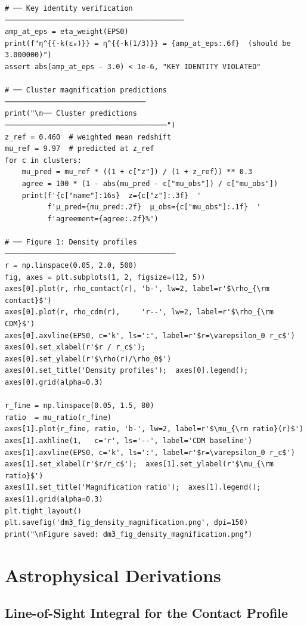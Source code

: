 \documentclass[11pt,a4paper,openright]{book}
\theoremstyle{dm3thm}
\theoremstyle{dm3def}
\begin{document}
\begin{lstlisting}[style=pythonstyle,caption={dark\_matter\_simulation.py ---
  Numerical verification of the dm\textsuperscript{3} predictions.},
  label={lst:python}]
# ── Key identity verification ──────────────────────────────────────────
amp_at_eps = eta_weight(EPS0)
print(f"η^{{-k(ε₀)}} = η^{{-k(1/3)}} = {amp_at_eps:.6f}  (should be 3.000000)")
assert abs(amp_at_eps - 3.0) < 1e-6, "KEY IDENTITY VIOLATED"

# ── Cluster magnification predictions ─────────────────────────────────
print("\n── Cluster predictions ──────────────────────────────────────")
z_ref = 0.460  # weighted mean redshift
mu_ref = 9.97  # predicted at z_ref
for c in clusters:
    mu_pred = mu_ref * ((1 + c["z"]) / (1 + z_ref)) ** 0.3
    agree = 100 * (1 - abs(mu_pred - c["mu_obs"]) / c["mu_obs"])
    print(f'{c["name"]:16s}  z={c["z"]:.3f}  '
          f'μ_pred={mu_pred:.2f}  μ_obs={c["mu_obs"]:.1f}  '
          f'agreement={agree:.2f}%')

# ── Figure 1: Density profiles ────────────────────────────────────────
r = np.linspace(0.05, 2.0, 500)
fig, axes = plt.subplots(1, 2, figsize=(12, 5))
axes[0].plot(r, rho_contact(r), 'b-', lw=2, label=r'$\rho_{\rm contact}$')
axes[0].plot(r, rho_cdm(r),     'r--', lw=2, label=r'$\rho_{\rm CDM}$')
axes[0].axvline(EPS0, c='k', ls=':', label=r'$r=\varepsilon_0 r_c$')
axes[0].set_xlabel(r'$r / r_c$');  axes[0].set_ylabel(r'$\rho(r)/\rho_0$')
axes[0].set_title('Density profiles');  axes[0].legend();  axes[0].grid(alpha=0.3)

r_fine = np.linspace(0.05, 1.5, 80)
ratio  = mu_ratio(r_fine)
axes[1].plot(r_fine, ratio, 'b-', lw=2, label=r'$\mu_{\rm ratio}(r)$')
axes[1].axhline(1,   c='r', ls='--', label='CDM baseline')
axes[1].axvline(EPS0, c='k', ls=':', label=r'$r=\varepsilon_0 r_c$')
axes[1].set_xlabel(r'$r/r_c$');  axes[1].set_ylabel(r'$\mu_{\rm ratio}$')
axes[1].set_title('Magnification ratio');  axes[1].legend();  axes[1].grid(alpha=0.3)
plt.tight_layout()
plt.savefig('dm3_fig_density_magnification.png', dpi=150)
print("\nFigure saved: dm3_fig_density_magnification.png")
\end{lstlisting}

\chapter{Astrophysical Derivations}
\label{app:astro}

\section{Line-of-Sight Integral for the Contact Profile}
\end{document}
